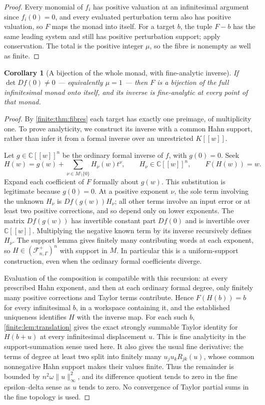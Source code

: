 \documentclass[11pt,letterpaper]{article}
\newtheorem{corollary}[theorem]{Corollary}
\theoremstyle{definition}
\theoremstyle{remark}
\newcommand{\C}{\mathbb C}
\newcommand{\Af}{\mathscr F}
\numberwithin{equation}{section}
\begin{document}
\begin{proof}
Every monomial of $f_i$ has positive valuation at an infinitesimal argument since $f_i(0)=0$, and every evaluated perturbation term also has positive valuation, so $F$ maps the monad into itself. For a target $b$, the tuple $F-b$ has the same leading system and still has positive perturbation support; apply conservation. The total is the positive integer $\mu$, so the fibre is nonempty as well as finite.
\end{proof}

\begin{corollary}[A bijection of the whole monad, with fine-analytic inverse]
\label{finite:cor:inverse}
If $\det Df(0)\neq0$ --- equivalently $\mu=1$ --- then $F$ is a bijection of the full infinitesimal monad onto itself, and its inverse is fine-analytic at every point of that monad.
\end{corollary}

\begin{proof}
By \cref{finite:thm:fibres} each target has exactly one preimage, of multiplicity one. To prove analyticity, we construct its inverse with a common Hahn support, rather than infer it from a formal inverse over an unrestricted $K[[w]]$.

Let $g\in\C[[w]]^n$ be the ordinary formal inverse of $f$, with $g(0)=0$. Seek
\[
 H(w)=g(w)+\sum_{\nu\in M\setminus\{0\}}H_\nu(w)t^\nu,
 \qquad H_\nu\in\C[[w]]^n,\qquad F(H(w))=w.
\]
Expand each coefficient of $F$ formally about $g(w)$. This substitution is legitimate because $g(0)=0$. At a positive exponent $\nu$, the sole term involving the unknown $H_\nu$ is $Df(g(w))H_\nu$; all other terms involve an input error or at least two positive corrections, and so depend only on lower exponents. The matrix $Df(g(w))$ has invertible constant part $Df(0)$ and is invertible over $\C[[w]]$. Multiplying the negative known term by its inverse recursively defines $H_\nu$. The support lemma gives finitely many contributing words at each exponent, so $H\in(\Af^+_{n,\Gamma})^n$ with support in $M$. In particular this is a uniform-support construction, even when the ordinary formal coefficients diverge.

Evaluation of the composition is compatible with this recursion: at every prescribed Hahn exponent, and then at each ordinary formal degree, only finitely many positive corrections and Taylor terms contribute. Hence $F(H(b))=b$ for every infinitesimal $b$, in a workspace containing it, and the established uniqueness identifies $H$ with the inverse map. For each such $b$, \cref{finite:lem:translation} gives the exact strongly summable Taylor identity for $H(b+u)$ at every infinitesimal displacement $u$. This is fine analyticity in the support-summation sense used here. It also gives the usual fine derivative: the terms of degree at least two split into finitely many $u_ju_kR_{jk}(u)$, whose common nonnegative Hahn support makes their values finite. Thus the remainder is bounded by $n^2\omega\|u\|_\infty^2$, and its difference quotient tends to zero in the fine epsilon--delta sense as $u$ tends to zero. No convergence of Taylor partial sums in the fine topology is used.
\end{proof}
\end{document}
